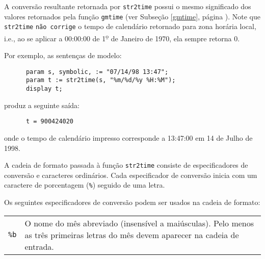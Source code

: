 \documentclass[11pt, brazil]{report}
\begin{document}



A conversão resultante retornada por {\tt str2time} possui o mesmo significado
dos valores retornados pela função {\tt gmtime} (ver Subseção
\ref{gmtime}, página \pageref{gmtime}). Note que {\tt str2time}
{\tt não corrige} o tempo de calendário retornado para zona horária local,
i.e., ao se aplicar a 00:00:00 de 1{\textsuperscript{\b{o}}}
de Janeiro de 1970, ela sempre retorna 0.


Por exemplo, as sentenças de modelo:

\begin{verbatim}
      param s, symbolic, := "07/14/98 13:47";
      param t := str2time(s, "%m/%d/%y %H:%M");
      display t;
\end{verbatim}

\noindent produz a seguinte saída:

\begin{verbatim}
      t = 900424020
\end{verbatim}

\noindent onde o tempo de calendário impresso corresponde a 13:47:00 em
14 de Julho de 1998.

A cadeia de formato passada à função {\tt str2time} consiste de
especificadores de conversão e caracteres ordinários. Cada especificador de
conversão inicia com um caractere de porcentagem ({\tt\%}) seguido de
uma letra.

Os seguintes especificadores de conversão podem ser usados na cadeia de formato:

\begin{tabular}{@{}p{20pt}p{421.5pt}@{}}
{\tt\%b}&O nome do mês abreviado (insensível a maiúsculas). Pelo menos as três
primeiras letras do mês devem aparecer na cadeia de entrada.\\
\end{tabular}
\end{document}
